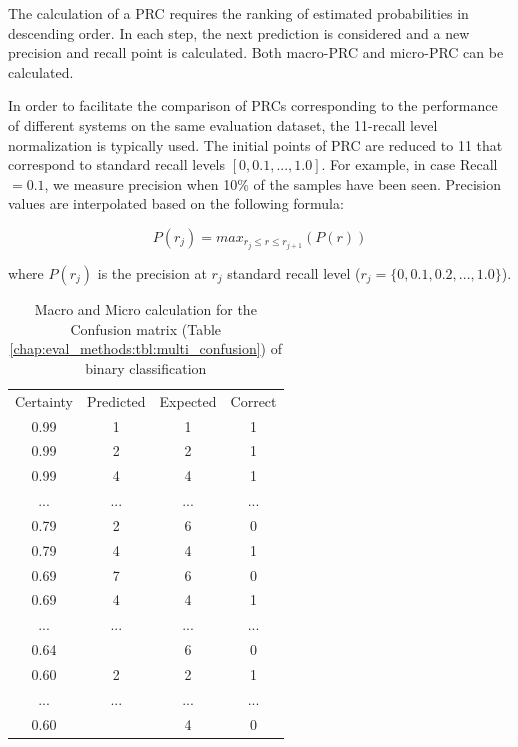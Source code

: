 The calculation of a PRC requires the ranking of estimated probabilities in descending order. In each step, the next prediction is considered and a new precision and recall point is calculated. Both macro-PRC and micro-PRC can be calculated.

In order to facilitate the comparison of PRCs corresponding to the performance of different systems on the same evaluation dataset, the 11-recall level normalization is typically used. The initial points of PRC are reduced to 11 that correspond to standard recall levels $[0,0.1,...,1.0]$. For example, in case Recall$=0.1$, we measure precision when 10\% of the samples have been seen. Precision values are interpolated based on the following formula:

\begin{equation}\label{chap:eval_methods:eq:11recall_level}
	P(r_j)=max_{r_j \leqslant r \leqslant r_{j+1}}(P(r))
\end{equation}

\noindent
where $P(r_j)$ is the precision at $r_j$ standard recall level ($r_j=\{0,0.1,0.2,...,1.0\}$).



\begin{table}[t]
	\center
	\caption{Macro and Micro calculation for the Confusion matrix (Table \ref{chap:eval_methods:tbl:multi_confusion}) of binary classification}\label{chap:eval_methods:tbl:prc}
	\begin{tabular}{|c|c|c|c|}
		\cline{1-4}
		Certainty & Predicted & Expected & Correct\\
		\cline{1-4}
		0.99 & 1 & 1 & 1 \\
		0.99 & 2 & 2 & 1 \\
		0.99 & 4 & 4 & 1 \\
		... & ... & ... & ... \\
		0.79 & 2 & 6 & 0 \\
		0.79 & 4 & 4 & 1 \\
		0.69 & 7 & 6 & 0 \\
		0.69 & 4 & 4 & 1 \\
		... & ... & ... & ... \\
		0.64 & \emptyset & 6 & 0 \\
		0.60 & 2 & 2 & 1 \\
		... & ... & ... & ... \\
		0.60 & \emptyset & 4 & 0 \\
		\cline{1-4}
	\end{tabular}
\end{table}

